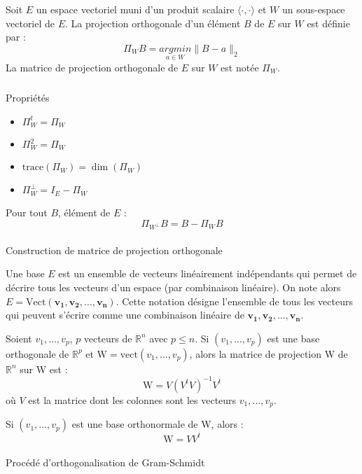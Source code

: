 \documentclass[
  letterpaper,
  DIV=11,
  numbers=noendperiod]{scrartcl}
\makeatletter
\let\oldparagraph\paragraph
\renewcommand{\paragraph}{
    \@ifstar
      \xxxParagraphStar
      \xxxParagraphNoStar
  }
\newcommand{\xxxParagraphStar}[1]{\oldparagraph*{#1}\mbox{}}
\newcommand{\xxxParagraphNoStar}[1]{\oldparagraph{#1}\mbox{}}
\let\oldsubparagraph\subparagraph
\renewcommand{\subparagraph}{
    \@ifstar
      \xxxSubParagraphStar
      \xxxSubParagraphNoStar
  }
\newcommand{\xxxSubParagraphStar}[1]{\oldsubparagraph*{#1}\mbox{}}
\newcommand{\xxxSubParagraphNoStar}[1]{\oldsubparagraph{#1}\mbox{}}
\providecommand{\tightlist}{%
  \setlength{\itemsep}{0pt}\setlength{\parskip}{0pt}}\usepackage{longtable,booktabs,array}
\makeatother
\begin{document}
Soit \(E\) un espace vectoriel muni d'un produit scalaire
\(\langle \cdot, \cdot \rangle\) et \(W\) un sous-espace vectoriel de
\(E\). La projection orthogonale d'un élément \(B\) de \(E\) sur \(W\)
est définie par : \[\Pi_W B = \underset{a \in W}{argmin} \|B - a\|_2\]
La matrice de projection orthogonale de \(E\) sur \(W\) est notée
\(\Pi_W\).

\subparagraph{Propriétés}\label{propriuxe9tuxe9s}

\begin{itemize}
\tightlist
\item
  \(\Pi_W^t = \Pi_W\)
\item
  \(\Pi_W^2 = \Pi_W\)
\item
  \(\text{trace}(\Pi_W) = \dim(\Pi_W)\)
\item
  \(\Pi_W^\perp = I_E - \Pi_W\)
\end{itemize}

Pour tout \(B\), élément de \(E\) : \[\Pi_{W^\perp} B = B - \Pi_{W} B\]

\paragraph{Construction de matrice de projection
orthogonale}\label{construction-de-matrice-de-projection-orthogonale}

Une base \(E\) est un ensemble de vecteurs linéairement indépendants qui
permet de décrire tous les vecteurs d'un espace (par combinaison
linéaire). On note alors
\(E = \text{Vect}(\mathbf{v_1}, \mathbf{v_2}, \dots, \mathbf{v_n})\).
Cette notation désigne l'ensemble de tous les vecteurs qui peuvent
s'écrire comme une combinaison linéaire de
\(\mathbf{v_1}, \mathbf{v_2}, \dots, \mathbf{v_n}\).

Soient \(v_1, \ldots, v_p\), \(p\) vecteurs de \(\mathbb{R}^n\) avec
\(p \leqslant n\). Si \((v_1, \ldots, v_p)\) est une base orthogonale de
\(\mathbb{R}^p\) et \(\text{W} = \text{vect}(v_1, \ldots, v_p)\), alors
la matrice de projection W de \(\mathbb{R}^n\) sur W est :
\[\text{W} = V (V^t V)^{-1} V^t
\] où \(V\) est la matrice dont les colonnes sont les vecteurs
\(v_1, \ldots, v_p\).

Si \((v_1, \ldots, v_p)\) est une base orthonormale de W, alors : \[
\text{W} = V V^t
\]

\paragraph{Procédé d'orthogonalisation de
Gram-Schmidt}\label{procuxe9duxe9-dorthogonalisation-de-gram-schmidt}
\end{document}
